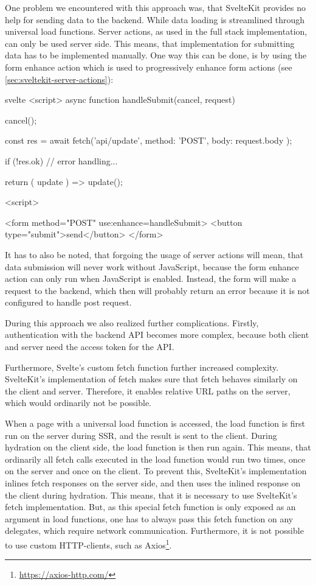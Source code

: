 One problem we encountered with this approach was, that SvelteKit provides no help for sending data to the backend. While data loading is streamlined through universal load functions. Server actions, as used in the full stack implementation, can only be used server side. This means, that implementation for submitting data has to be implemented manually. One way this can be done, is by using the form enhance action which is used to progressively enhance form actions (see \ref{sec:sveltekit-server-actions}):

\begin{myminted}{svelte}{}
    <script>
    async function handleSubmit({cancel, request}) {
    cancel();

    const res = await fetch('api/update', {
            method: 'POST',
            body: request.body
        });

    if (!res.ok) {
            // error handling...
        }

    return ({ update }) => {
    update();
    }
    }
    <script>

    <form method="POST" use:enhance={handleSubmit}>
    <button type="submit">send</button>
    </form>
\end{myminted}

It has to also be noted, that forgoing the usage of server actions will mean, that data submission will never work without JavaScript, because the form enhance action can only run when JavaScript is enabled. Instead, the form will make a request to the backend, which then will probably return an error because it is not configured to handle post request.

During this approach we also realized further complications. Firstly, authentication with the backend API becomes more complex, because both client and server need the access token for the API.

Furthermore, Svelte's custom fetch function further increased complexity. SvelteKit's implementation of fetch makes sure that fetch behaves similarly on the client and server. Therefore, it enables relative URL paths on the server, which would ordinarily not be possible.

When a page with a universal load function is accessed, the load function is first run on the server during SSR, and the result is sent to the client. During hydration on the client side, the load function is then run again. This means, that ordinarily all fetch calls executed in the load function would run two times, once on the server and once on the client. To prevent this, SvelteKit's implementation inlines fetch responses on the server side, and then uses the inlined response on the client during hydration. This means, that it is necessary to use SvelteKit's fetch implementation. But, as this special fetch function is only exposed as an argument in load functions, one has to always pass this fetch function on any delegates, which require network communication. Furthermore, it is not possible to use custom HTTP-clients, such as Axios\footnote{\url{https://axios-http.com/}}.

